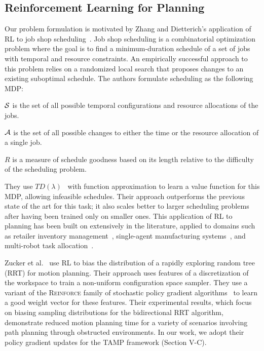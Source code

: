 \subsection{Reinforcement Learning for Planning}
Our problem formulation is motivated by Zhang and Dietterich's application of RL to job
shop scheduling~\cite{JobShopSched}. Job shop scheduling is a combinatorial optimization problem where the goal is to find
a minimum-duration schedule of a set of jobs with temporal and resource constraints. An empirically
successful approach to this problem relies on a randomized local search that proposes changes to an
existing suboptimal schedule. The authors formulate scheduling as the following MDP:
\begin{tightlist}
\item $\mathcal{S}$ is the set of all possible temporal configurations and resource allocations of the jobs.
\item $\mathcal{A}$ is the set of all possible changes to either the time or the resource allocation of a single job.
\item $R$ is a measure of schedule goodness based on its length relative to the difficulty of the scheduling problem.
\end{tightlist}
They use $TD(\lambda)$~\cite{suttonbarto} with function approximation to learn a value function
for this MDP, allowing infeasible schedules. Their approach outperforms the previous state of the art for this task;
it also scales better to larger scheduling problems after having been trained only on smaller ones.
This application of RL to planning has been built on extensively
in the literature, applied to domains such as retailer inventory
management~\cite{van1997neuro}, single-agent manufacturing systems~\cite{Wang200573}, and multi-robot
task allocation~\cite{dahl2009multi}.

Zucker et al.~\cite{workspacebias} use RL to bias the distribution of a rapidly exploring random tree (RRT)
for motion planning. Their approach uses features of a discretization of the workspace to train
a non-uniform configuration space sampler. They use a variant of the \textsc{Reinforce} family
of stochastic policy gradient algorithms~\cite{reinforce1992} to learn a good weight vector for these features.
Their experimental results, which focus on biasing sampling distributions for the bidirectional
RRT algorithm, demonstrate reduced motion planning time for a variety of scenarios involving path
planning through obstructed environments. In our work, we adopt their policy gradient updates for the TAMP framework
(Section V-C).

